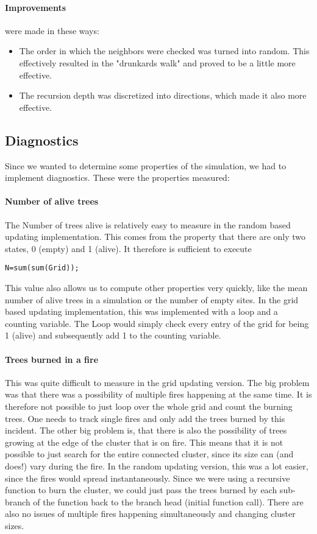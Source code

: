 \documentclass[11pt]{article}
\begin{document}
\paragraph*{Improvements} were made in these ways:
\begin{itemize}
\item The order in which the neighbors were checked was turned into random. This effectively resulted in the "drunkards walk" and proved to be a little more effective.
\item The recursion depth was discretized into directions, which made it also more effective.
\end{itemize}

\subsection{Diagnostics}
Since we wanted to determine some properties of the simulation, we had to implement diagnostics. These were the properties measured:
\paragraph*{Number of alive trees} 
The Number of trees alive is relatively easy to measure in the random based updating implementation. This comes from the property that there are only two states, 0 (empty) and 1 (alive). It therefore is sufficient to execute
\begin{verbatim}
N=sum(sum(Grid));
\end{verbatim}
This value also allows us to compute other properties very quickly, like the mean number of alive trees in a simulation or the number of empty sites.
In the grid based updating implementation, this was implemented with a loop and a counting variable. The Loop would simply check every entry of the grid for being 1 (alive) and subsequently add 1 to the counting variable.
\paragraph*{Trees burned in a fire}
This was quite difficult to measure in the grid updating version. The big problem was that there was a possibility of multiple fires happening at the same time. It is therefore not possible to just loop over the whole grid and count the burning trees. One needs to track single fires and only add the trees burned by this incident. The other big problem is, that there is also the possibility of trees growing at the edge of the cluster that is on fire. This means that it is not possible to just search for the entire connected cluster, since its size can (and does!) vary during the fire.
In the random updating version, this was a lot easier, since the fires would spread instantaneously. Since we were using a recursive function to burn the cluster, we could just pass the trees burned by each sub-branch of the function back to the branch head (initial function call). There are also no issues of multiple fires happening simultaneously and changing cluster sizes.
\end{document}

